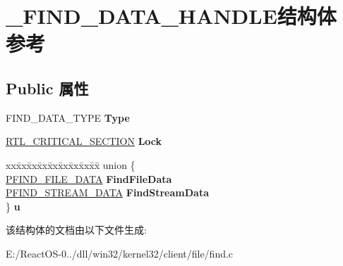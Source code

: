 \hypertarget{struct___f_i_n_d___d_a_t_a___h_a_n_d_l_e}{}\section{\+\_\+\+F\+I\+N\+D\+\_\+\+D\+A\+T\+A\+\_\+\+H\+A\+N\+D\+L\+E结构体 参考}
\label{struct___f_i_n_d___d_a_t_a___h_a_n_d_l_e}
\subsection*{Public 属性}
\begin{DoxyCompactItemize}
\item 
\mbox{\label{struct___f_i_n_d___d_a_t_a___h_a_n_d_l_e_a92ed144579af19ede42459336f01dc36}} 
F\+I\+N\+D\+\_\+\+D\+A\+T\+A\+\_\+\+T\+Y\+PE {\bfseries Type}
\item 
\mbox{\label{struct___f_i_n_d___d_a_t_a___h_a_n_d_l_e_a9e10e1701fe45370b6c3df8b9515f5bc}} 
\hyperlink{struct___r_t_l___c_r_i_t_i_c_a_l___s_e_c_t_i_o_n}{R\+T\+L\+\_\+\+C\+R\+I\+T\+I\+C\+A\+L\+\_\+\+S\+E\+C\+T\+I\+ON} {\bfseries Lock}
\item 
\mbox{\label{struct___f_i_n_d___d_a_t_a___h_a_n_d_l_e_a914ac4cedb15929ba794f90dd0171bbb}} 
\begin{tabbing}
xx\=xx\=xx\=xx\=xx\=xx\=xx\=xx\=xx\=\kill
union \{\\
\>\hyperlink{struct___f_i_n_d___f_i_l_e___d_a_t_a}{PFIND\_FILE\_DATA} {\bfseries FindFileData}\\
\>\hyperlink{struct___f_i_n_d___s_t_r_e_a_m___d_a_t_a}{PFIND\_STREAM\_DATA} {\bfseries FindStreamData}\\
\} {\bfseries u}\\

\end{tabbing}\end{DoxyCompactItemize}


该结构体的文档由以下文件生成\+:\begin{DoxyCompactItemize}
\item 
E\+:/\+React\+O\+S-\/0../dll/win32/kernel32/client/file/find.\+c\end{DoxyCompactItemize}
